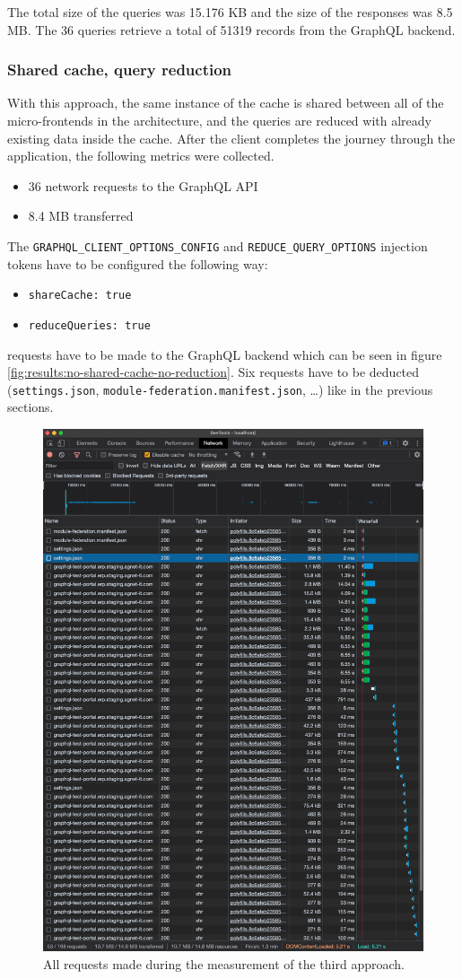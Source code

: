 \noindent The total size of the queries was 15.176 KB and the size of the responses was 8.5 MB. The 36 queries retrieve a total of 51319 records from the GraphQL backend.

\subsubsection{Shared cache, query reduction}\label{subsubsection:results:performance-measurement:separate-cache-reduction}

With this approach, the same instance of the cache is shared between all of the micro-frontends in the architecture, and the queries are reduced with already existing data inside the cache. After the client completes the journey through the application, the following metrics were collected.

\begin{itemize}
  \item 36 network requests to the GraphQL \ac{API}
  \item 8.4 MB transferred
\end{itemize}

\noindent The \texttt{GRAPHQL\_CLIENT\_OPTIONS\_CONFIG} and \texttt{REDUCE\_QUERY\_OPTIONS} injection tokens have to be configured the following way:

\begin{itemize}
  \item \texttt{shareCache: true}
  \item \texttt{reduceQueries: true}
\end{itemize}

 requests have to be made to the GraphQL backend which can be seen in figure \ref{fig:results:no-shared-cache-no-reduction}. Six requests have to be deducted (\texttt{settings.json}, \texttt{module-federation.manifest.json}, \dots) like in the previous sections.

\ifshowImages
\begin{figure}[H]
\centering
\includegraphics[width=0.6\linewidth]{images/results/1-attempt/no-shared-cache-no-reduction.png}
\caption{All requests made during the measurement of the third approach.}\label{fig:results:shared-cache-reduction}
\end{figure}
\fi


